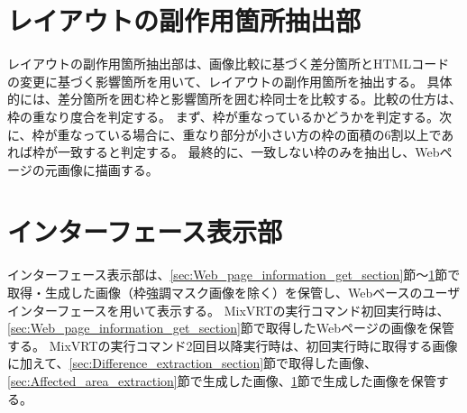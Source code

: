 \section{レイアウトの副作用箇所抽出部}\label{sec:Layout_subEffect_extraction_section}
レイアウトの副作用箇所抽出部は、画像比較に基づく差分箇所とHTMLコードの変更に基づく影響箇所を用いて、レイアウトの副作用箇所を抽出する。
具体的には、差分箇所を囲む枠と影響箇所を囲む枠同士を比較する。比較の仕方は、枠の重なり度合を判定する。
まず、枠が重なっているかどうかを判定する。次に、枠が重なっている場合に、重なり部分が小さい方の枠の面積の6割以上であれば枠が一致すると判定する。
最終的に、一致しない枠のみを抽出し、Webページの元画像に描画する。


\section{インターフェース表示部}\label{sec:Interface_Display_Section}
インターフェース表示部は、\ref{sec:Web_page_information_get_section}節～\ref{sec:Layout_subEffect_extraction_section}節で取得・生成した画像（枠強調マスク画像を除く）を保管し、Webベースのユーザインターフェースを用いて表示する。
MixVRTの実行コマンド初回実行時は、\ref{sec:Web_page_information_get_section}節で取得したWebページの画像を保管する。
MixVRTの実行コマンド2回目以降実行時は、初回実行時に取得する画像に加えて、\ref{sec:Difference_extraction_section}節で取得した画像、
\ref{sec:Affected_area_extraction}節で生成した画像、\ref{sec:Layout_subEffect_extraction_section}節で生成した画像を保管する。








